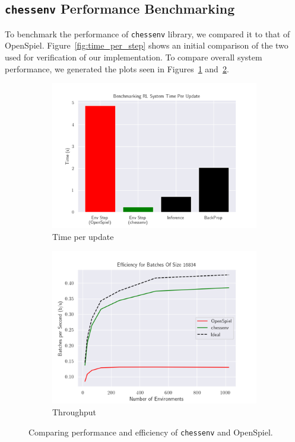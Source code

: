 \documentclass[12pt]{article}
\begin{document}
\subsection{\texttt{chessenv} Performance Benchmarking}\label{subsec:chessenv-performance}

To benchmark the performance of \texttt{chessenv} library, we compared it to that of OpenSpiel. Figure~\ref{fig:time_per_step} shows an initial comparison of the two used for verification of our implementation. To compare overall system performance, we generated the plots seen in Figures~\ref{subfig:time-per-update} and~\ref{subfig:efficiency}.

\begin{figure}[H]
    \centering
    \begin{subfigure}[c]{0.49\textwidth}
        \centering
        \includegraphics[width=\textwidth]{plots/benchmark.png}
        \caption{Time per update}
        \label{subfig:time-per-update}
    \end{subfigure}
    \begin{subfigure}[c]{0.49\textwidth}
        \includegraphics[width=\textwidth]{plots/efficiency.png}
        \caption{Throughput}
        \label{subfig:efficiency}
    \end{subfigure}
    \caption{Comparing performance and efficiency of \texttt{chessenv} and OpenSpiel.}
    \label{fig:openspiel-comparison}
\end{figure}
\end{document}
